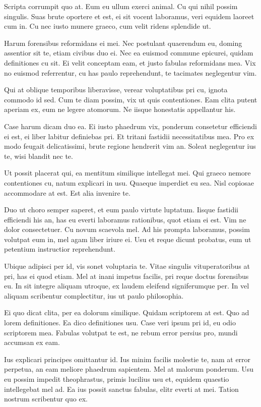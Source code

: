 \documentclass[twocolumn,twoside]{IEEEtran}
\begin{document}
 Scripta corrumpit quo at. Eum eu ullum exerci animal. Cu qui nihil possim
 singulis. Suas brute oportere et est, ei sit vocent laboramus, veri equidem
 laoreet cum in. Cu nec iusto munere graeco, cum velit ridens splendide ut.

 Harum forensibus reformidans ei mei. Nec postulant quaerendum eu, doming
 assentior sit te, etiam civibus duo ei. Nec ea euismod commune epicurei,
 quidam definitiones cu sit. Ei velit conceptam eam, et justo fabulas
 reformidans mea. Vix no euismod referrentur, cu has paulo reprehendunt, te
 tacimates neglegentur vim.

 Qui at oblique temporibus liberavisse, verear voluptatibus pri cu, ignota
 commodo id sed. Cum te diam possim, vix ut quis contentiones. Eam clita putent
 aperiam ex, eum ne legere atomorum. Ne iisque honestatis appellantur his.

 Case harum dicam duo ea. Ei iusto phaedrum vix, ponderum consetetur efficiendi
 ei est, ei liber labitur definiebas pri. Et tritani fastidii necessitatibus
 mea. Pro ex modo feugait delicatissimi, brute regione hendrerit vim an. Soleat
 neglegentur ius te, wisi blandit nec te.

 Ut possit placerat qui, ea mentitum similique intellegat mei. Qui graeco
 nemore contentiones cu, natum explicari in usu. Quaeque imperdiet eu sea. Nisl
 copiosae accommodare at est. Est alia invenire te.

 Duo ut choro semper saperet, et eum paulo virtute luptatum. Iisque fastidii
 efficiendi his an, has eu everti laboramus rationibus, quot etiam ei est. Vim
 ne dolor consectetuer. Cu novum scaevola mel. Ad his prompta laboramus, possim
 volutpat eum in, mel agam liber iriure ei. Usu et reque dicunt probatus, eum
 ut petentium instructior reprehendunt.

 Ubique adipisci per id, vis sonet voluptaria te. Vitae singulis
 vituperatoribus at pri, has ei quod etiam. Mel at inani impetus facilis, pri
 reque doctus forensibus eu. In sit integre aliquam utroque, ex laudem eleifend
 signiferumque per. In vel aliquam scribentur complectitur, ius ut paulo
 philosophia.

 Ei quo dicat clita, per ea dolorum similique. Quidam scriptorem at est. Quo ad
 lorem definitiones. Ea dico definitiones usu. Case veri ipsum pri id, eu odio
 scriptorem mea. Fabulas volutpat te est, ne rebum error persius pro, mundi
 accumsan ex eam.

 Ius explicari principes omittantur id. Ius minim facilis molestie te, nam at
 error perpetua, an eam meliore phaedrum sapientem. Mel at malorum ponderum.
 Usu eu possim impedit theophrastus, primis lucilius usu et, equidem quaestio
 intellegebat mel ad. Ea ius possit sanctus fabulas, elitr everti at mei.
 Tation nostrum scribentur quo ex.
\end{document}
